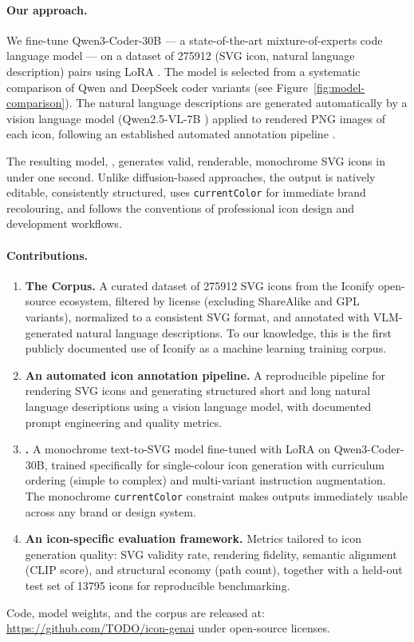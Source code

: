 \paragraph{Our approach.}
We fine-tune Qwen3-Coder-30B \citep{qwen3} --- a state-of-the-art
mixture-of-experts code language model --- on a dataset of \num{275912}
(SVG icon, natural language description) pairs using LoRA \citep{hu2022lora}.
The model is selected from a systematic comparison of Qwen and DeepSeek coder
variants (see Figure~\ref{fig:model-comparison}). The natural language
descriptions are generated automatically by a vision language model
(Qwen2.5-VL-7B \citep{qwen25vl}) applied to rendered PNG images of each icon,
following an established automated annotation pipeline
\citep{rodriguez2025starvector, xing2025llm4svg}.

The resulting model, \textbf{\method}, generates valid, renderable, monochrome
SVG icons in under one second. Unlike diffusion-based approaches, the output
is natively editable, consistently structured, uses \texttt{currentColor} for
immediate brand recolouring, and follows the conventions of professional icon
design and development workflows.

\paragraph{Contributions.}
\begin{enumerate}
    \item \textbf{The \dataset{} Corpus.} A curated dataset of \num{275912}
          SVG icons from the Iconify open-source ecosystem, filtered by license
          (excluding ShareAlike and GPL variants), normalized to a consistent
          SVG format, and annotated with VLM-generated natural language
          descriptions. To our knowledge, this is the first publicly documented
          use of Iconify as a machine learning training corpus.

    \item \textbf{An automated icon annotation pipeline.} A reproducible
          pipeline for rendering SVG icons and generating structured
          short and long natural language descriptions using a vision language
          model, with documented prompt engineering and quality metrics.

    \item \textbf{\method.} A monochrome text-to-SVG model fine-tuned with
          LoRA on Qwen3-Coder-30B, trained specifically for single-colour icon
          generation with curriculum ordering (simple to complex) and
          multi-variant instruction augmentation. The monochrome
          \texttt{currentColor} constraint makes outputs immediately usable
          across any brand or design system.

    \item \textbf{An icon-specific evaluation framework.} Metrics tailored to
          icon generation quality: SVG validity rate, rendering fidelity,
          semantic alignment (CLIP score), and structural economy (path count),
          together with a held-out test set of \num{13795} icons for
          reproducible benchmarking.
\end{enumerate}

Code, model weights, and the \dataset{} corpus are released at:
\url{https://github.com/TODO/icon-genai} under open-source licenses.

